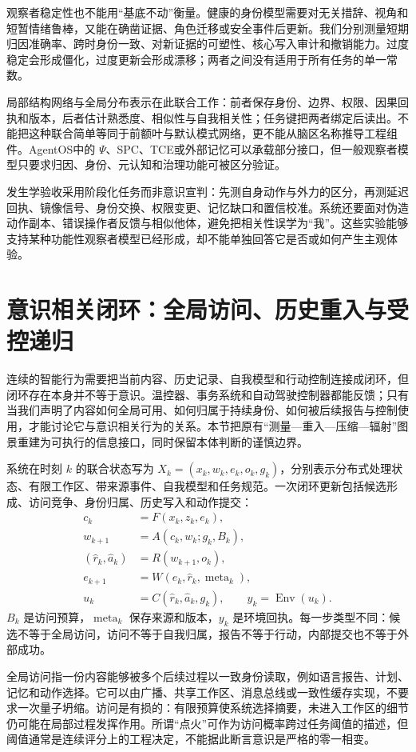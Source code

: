 观察者稳定性也不能用“基底不动”衡量。健康的身份模型需要对无关措辞、视角和短暂情绪鲁棒，又能在确凿证据、角色迁移或安全事件后更新。我们分别测量短期归因准确率、跨时身份一致、对新证据的可塑性、核心写入审计和撤销能力。过度稳定会形成僵化，过度更新会形成漂移；两者之间没有适用于所有任务的单一常数。

局部结构网络与全局分布表示在此联合工作：前者保存身份、边界、权限、因果回执和版本，后者估计熟悉度、相似性与自我相关性；任务键把两者绑定后读出。不能把这种联合简单等同于前额叶与默认模式网络，更不能从脑区名称推导工程组件。AgentOS中的 $\Psi$、SPC、TCE或外部记忆可以承载部分接口，但一般观察者模型只要求归因、身份、元认知和治理功能可被区分验证。

发生学验收采用阶段化任务而非意识宣判：先测自身动作与外力的区分，再测延迟回执、镜像信号、身份交换、权限变更、记忆缺口和置信校准。系统还要面对伪造动作副本、错误操作者反馈与相似他体，避免把相关性误学为“我”。这些实验能够支持某种功能性观察者模型已经形成，却不能单独回答它是否或如何产生主观体验。

\section{意识相关闭环：全局访问、历史重入与受控递归}
\label{sec:consciousness_closed_loop}
连续的智能行为需要把当前内容、历史记录、自我模型和行动控制连接成闭环，但闭环存在本身并不等于意识。温控器、事务系统和自动驾驶控制器都能反馈；只有当我们声明了内容如何全局可用、如何归属于持续身份、如何被后续报告与控制使用，才能讨论它与意识相关行为的关系。本节把原有“测量—重入—压缩—辐射”图景重建为可执行的信息接口，同时保留本体判断的谨慎边界。

系统在时刻 $k$ 的联合状态写为 $X_k=(x_k,w_k,e_k,o_k,g_k)$，分别表示分布式处理状态、有限工作区、带来源事件、自我模型和任务规范。一次闭环更新包括候选形成、访问竞争、身份归属、历史写入和动作提交：
\[
\begin{aligned}
c_k&=F(x_k,z_k,e_k),\\
w_{k+1}&=A(c_k,w_k;g_k,B_k),\\
(\hat r_k,\hat a_k)&=R(w_{k+1},o_k),\\
e_{k+1}&=W(e_k,\hat r_k,\operatorname{meta}_k),\\
u_k&=C(\hat r_k,\hat a_k,g_k),\qquad y_k=\operatorname{Env}(u_k).
\end{aligned}
\]
$B_k$ 是访问预算，$\operatorname{meta}_k$ 保存来源和版本，$y_k$ 是环境回执。每一步类型不同：候选不等于全局访问，访问不等于自我归属，报告不等于行动，内部提交也不等于外部成功。

全局访问指一份内容能够被多个后续过程以一致身份读取，例如语言报告、计划、记忆和动作选择。它可以由广播、共享工作区、消息总线或一致性缓存实现，不要求一次量子坍缩。访问是有损的：有限预算使系统选择摘要，未进入工作区的细节仍可能在局部过程发挥作用。所谓“点火”可作为访问概率跨过任务阈值的描述，但阈值通常是连续评分上的工程决定，不能据此断言意识是严格的零一相变。

